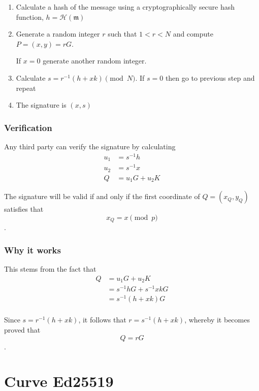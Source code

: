 \begin{enumerate}
	
	\item Calculate a hash of the message using a cryptographically secure hash function, \(h = \mathcal{H}(\mathfrak{m})\)
	
	\item Generate a random integer \(r\) such that \(1 < r < N\) and compute \(P = (x, y) = r G\). 

       If \(x = 0\) generate another random integer.
	
	\item Calculate \(s = r^{-1} (h + x k) \pmod N\). If \(s = 0\) then go to previous step and repeat
	
	\item The signature is \((x, s)\)
\end{enumerate}


\subsubsection*{Verification}

Any third party can verify the signature by calculating
\begin{align*}
  u_1 & = s^{-1} h \\
  u_2 & = s^{-1} x \\
  Q   & = u_1 G + u_2 K
\end{align*}

The signature will be valid if and only if the first coordinate of \(Q = (x_Q, y_Q)\) satisfies that  
\[x_Q = x \pmod p\]. 

\subsubsection*{Why it works}

This stems from the fact that
\begin{align*}
Q &= u_1 G + u_2 K \\
  &= s^{-1} h G + s^{ -1} x k G \\
  &= s^{-1} (h + x k) G \\
\end{align*}

Since \(s = r^{-1} (h + x k) \), it follows that \(r = s^{-1}(h + x k)\), whereby it becomes proved that \[Q = r G\].

\section{Curve Ed25519}

